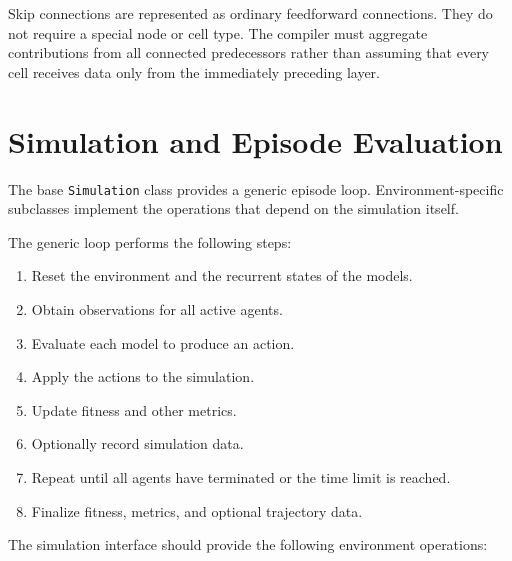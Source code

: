 \documentclass[11pt]{article}
\begin{document}
Skip connections are represented as ordinary feedforward connections.
They do not require a special node or cell type. The compiler must
aggregate contributions from all connected predecessors rather than
assuming that every cell receives data only from the immediately
preceding layer.

\section{Simulation and Episode Evaluation}

The base \texttt{Simulation} class provides a generic episode loop.
Environment-specific subclasses implement the operations that depend
on the simulation itself.

The generic loop performs the following steps:

\begin{enumerate}
    \item Reset the environment and the recurrent states of the models.
    \item Obtain observations for all active agents.
    \item Evaluate each model to produce an action.
    \item Apply the actions to the simulation.
    \item Update fitness and other metrics.
    \item Optionally record simulation data.
    \item Repeat until all agents have terminated or the time limit is
    reached.
    \item Finalize fitness, metrics, and optional trajectory data.
\end{enumerate}

The simulation interface should provide the following environment
operations:
\end{document}
